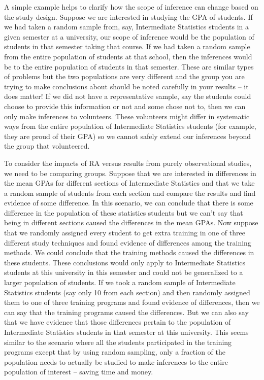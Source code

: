 \documentclass[
]{book}
\begin{document}
\indent A simple example helps to clarify how the scope of inference can change
based on the study design.  Suppose
we are interested in studying the GPA of students. If we had taken a random
sample from, say, Intermediate Statistics students in a given semester at a university, our scope of
inference would be the population of students in that semester taking that course. If we had
taken a random sample  from the entire population of students at that school, then the inferences would
be to the entire population of students in that semester. These are similar types of
problems but the two populations are very different and the group you are trying
to make conclusions about should be noted carefully in your results -- it does
matter! If we did not have a representative sample, say the students could
choose to provide this information or not and some chose not to, then we can only make inferences to
volunteers. These volunteers might differ in systematic ways from the entire
population of Intermediate Statistics students (for example, they are proud of their GPA) so we cannot safely extend our inferences beyond the group that volunteered.

\indent To consider the impacts of RA versus results from purely observational
studies, we need to be
comparing groups. Suppose that we are interested in differences in the mean
GPAs for different sections of Intermediate Statistics and that we take a random sample  of
students from each section and compare the results and find evidence of some
difference. In this scenario, we can conclude that there is some difference in
the population of these statistics students but we can't say that being in different
sections caused the differences in the mean GPAs. Now suppose that we randomly
assigned every student to get extra training in one of three different
study techniques and found evidence of differences among the training methods.
We could conclude that the training methods caused the differences in these
students. These conclusions would only apply to Intermediate Statistics students at this university in this semester and could
not be generalized to a larger population of students. If we took a random
sample of Intermediate Statistics students (say only 10 from each section) and then randomly
assigned them to one of three training programs and found evidence of
differences, then we can say that the training programs caused the differences.
But we can also say that we have evidence that those differences pertain to the
population of Intermediate Statistics students in that semester at this university. This seems similar to the scenario where all
the students participated in the training programs except that by using random
sampling, only a fraction of the population needs to actually be studied to
make inferences to the entire population of interest -- saving time and money.
\end{document}

